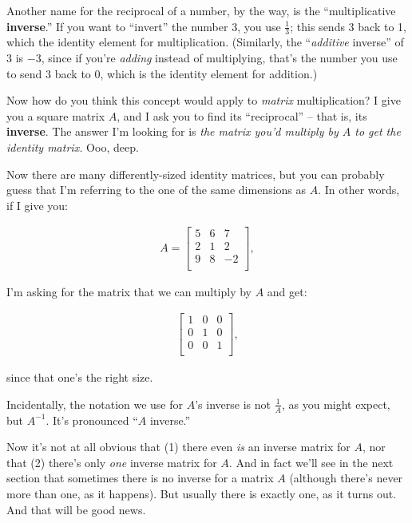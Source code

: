 Another name for the reciprocal of a number, by the way, is the
``multiplicative \textbf{inverse}.'' If you want to ``invert'' the number $3$,
you use $\frac{1}{3}$; this sends $3$ back to 1, which the identity element for
multiplication. (Similarly, the ``\textit{additive} inverse'' of $3$ is $-3$,
since if you're \textit{adding} instead of multiplying, that's the number you
use to send $3$ back to 0, which is the identity element for addition.)

\smallskip

Now how do you think this concept would apply to \textit{matrix}
multiplication? I give you a square matrix $A$, and I ask you to find its
``reciprocal'' -- that is, its \textbf{inverse}. The answer I'm looking for is
\textit{the matrix you'd multiply by $A$ to get the identity matrix.} Ooo,
deep.

Now there are many differently-sized identity matrices, but you can probably
guess that I'm referring to the one of the same dimensions as $A$. In other
words, if I give you:

\vspace{-.15in}
\begin{align*}
A = 
\begin{bmatrix}
5 & 6 & 7 \\
2 & 1 & 2 \\
9 & 8 & -2 \\
\end{bmatrix},
\end{align*}
\vspace{-.15in}

I'm asking for the matrix that we can multiply by $A$ and get:

\vspace{-.15in}
\begin{align*}
\begin{bmatrix}
1 & 0 & 0 \\
0 & 1 & 0 \\
0 & 0 & 1 \\
\end{bmatrix},
\end{align*}
\vspace{-.15in}

since that one's the right size.

\smallskip
Incidentally, the notation we use for $A$'s inverse is not $\frac{1}{A}$, as
you might expect, but $A^{-1}$. It's pronounced ``$A$ inverse.''
\smallskip

Now it's not at all obvious that (1) there even \textit{is} an inverse matrix
for $A$, nor that (2) there's only \textit{one} inverse matrix for $A$. And in
fact we'll see in the next section that sometimes there is no inverse for a
matrix $A$ (although there's never more than one, as it happens). But usually
there is exactly one, as it turns out. And that will be good news.

